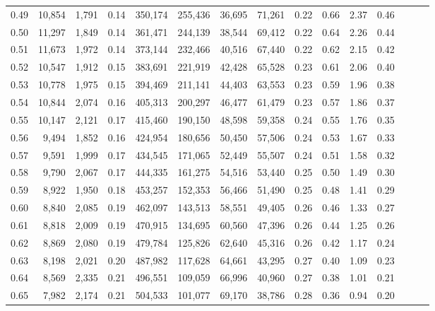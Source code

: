 \begin{tabular}{rrrrrrrrrrrrrrr}
0.49 &  10,854 &  1,791 &  0.14 &  350,174 &  255,436 &   36,695 &   71,261 &  0.22 &  0.66 &  2.37 &      0.46 \\
0.50 &  11,297 &  1,849 &  0.14 &  361,471 &  244,139 &   38,544 &   69,412 &  0.22 &  0.64 &  2.26 &      0.44 \\
0.51 &  11,673 &  1,972 &  0.14 &  373,144 &  232,466 &   40,516 &   67,440 &  0.22 &  0.62 &  2.15 &      0.42 \\
0.52 &  10,547 &  1,912 &  0.15 &  383,691 &  221,919 &   42,428 &   65,528 &  0.23 &  0.61 &  2.06 &      0.40 \\
0.53 &  10,778 &  1,975 &  0.15 &  394,469 &  211,141 &   44,403 &   63,553 &  0.23 &  0.59 &  1.96 &      0.38 \\
0.54 &  10,844 &  2,074 &  0.16 &  405,313 &  200,297 &   46,477 &   61,479 &  0.23 &  0.57 &  1.86 &      0.37 \\
0.55 &  10,147 &  2,121 &  0.17 &  415,460 &  190,150 &   48,598 &   59,358 &  0.24 &  0.55 &  1.76 &      0.35 \\
0.56 &   9,494 &  1,852 &  0.16 &  424,954 &  180,656 &   50,450 &   57,506 &  0.24 &  0.53 &  1.67 &      0.33 \\
0.57 &   9,591 &  1,999 &  0.17 &  434,545 &  171,065 &   52,449 &   55,507 &  0.24 &  0.51 &  1.58 &      0.32 \\
0.58 &   9,790 &  2,067 &  0.17 &  444,335 &  161,275 &   54,516 &   53,440 &  0.25 &  0.50 &  1.49 &      0.30 \\
0.59 &   8,922 &  1,950 &  0.18 &  453,257 &  152,353 &   56,466 &   51,490 &  0.25 &  0.48 &  1.41 &      0.29 \\
0.60 &   8,840 &  2,085 &  0.19 &  462,097 &  143,513 &   58,551 &   49,405 &  0.26 &  0.46 &  1.33 &      0.27 \\
0.61 &   8,818 &  2,009 &  0.19 &  470,915 &  134,695 &   60,560 &   47,396 &  0.26 &  0.44 &  1.25 &      0.26 \\
0.62 &   8,869 &  2,080 &  0.19 &  479,784 &  125,826 &   62,640 &   45,316 &  0.26 &  0.42 &  1.17 &      0.24 \\
0.63 &   8,198 &  2,021 &  0.20 &  487,982 &  117,628 &   64,661 &   43,295 &  0.27 &  0.40 &  1.09 &      0.23 \\
0.64 &   8,569 &  2,335 &  0.21 &  496,551 &  109,059 &   66,996 &   40,960 &  0.27 &  0.38 &  1.01 &      0.21 \\
0.65 &   7,982 &  2,174 &  0.21 &  504,533 &  101,077 &   69,170 &   38,786 &  0.28 &  0.36 &  0.94 &      0.20 \\

\end{tabular}
